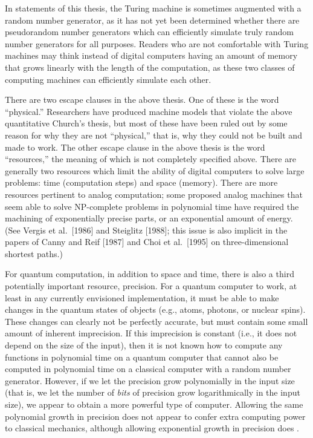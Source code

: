 In statements of this thesis, the Turing machine is sometimes augmented with 
a random number generator, as it has not yet been determined whether there 
are pseudorandom number generators which can efficiently simulate truly
random number generators for all purposes.
Readers who are not comfortable with Turing machines may think instead
of digital computers having an amount of memory that grows linearly with 
the length of the computation, as these two classes of computing machines
can efficiently simulate each other.

There are two escape clauses in the above thesis.  One of these is
the word ``physical.''  Researchers
have produced machine models that violate the 
above quantitative Church's thesis, 
but most of these have been ruled out by some reason for why they are
not ``physical,'' that is, why they could not be built and made
to work.  The other escape clause in the above thesis
is the word ``resources,'' the meaning of which is not completely specified 
above.  There are generally two resources which limit the ability of digital
computers to solve large problems: time (computation steps)
and space (memory).  There are more resources pertinent to analog 
computation; some proposed analog machines that seem able
to solve NP-complete problems in polynomial time have required the 
machining of exponentially precise parts, or an exponential amount of energy.
(See Vergis et al.\ [1986] and Steiglitz [1988]; this issue is also
implicit in the papers of Canny and Reif [1987] and Choi et al.\ [1995]
on three-dimensional shortest paths.)

For quantum computation, in addition to space and time,
there is also a third potentially important resource, precision.  For a 
quantum computer to work, at least in any currently envisioned 
implementation, it must be able to make changes in the quantum states 
of objects (e.g., atoms, photons, or nuclear spins).  These
changes can clearly not be perfectly accurate, but must contain some
small amount of 
inherent imprecision.  If this imprecision is constant (i.e., it does
not depend on the size of the input), then it is not
known how to compute any functions in polynomial time on a
quantum computer that cannot also be 
computed in polynomial time on a classical computer with a random
number generator.  However,
if we let the precision grow polynomially in the input size (that is,
we let the number of {\em bits} of precision grow logarithmically in
the input size), we appear
to obtain a more powerful type of computer.  Allowing the same polynomial
growth in precision does not appear to confer extra computing power to
classical mechanics, although allowing exponential growth in precision does
\cite{HaSi,VeStDi}.   

